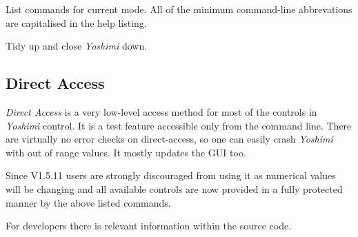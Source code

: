       List commands for current mode.  All of the minimum command-line
      abbrevations are capitalised in the help listing.

         Tidy up and close \textsl{Yoshimi} down.

\subsection{Direct Access}
\label{subsec:command_line_direct_access}

   \textsl{Direct Access} is a very low-level access method for most of the
   controls in \textsl{Yoshimi} control.
   It is a test feature accessible only from the command line.
   There are virtually no error checks on direct-access, so one can easily
   crash \textsl{Yoshimi} with out of range values.
   It mostly updates the GUI too.

   Since V1.5.11 users are strongly discouraged from using it as numerical
   values will be changing and all available controls are now provided in a
   fully protected manner by the above listed commands.

   For developers there is relevant information within the source code.

